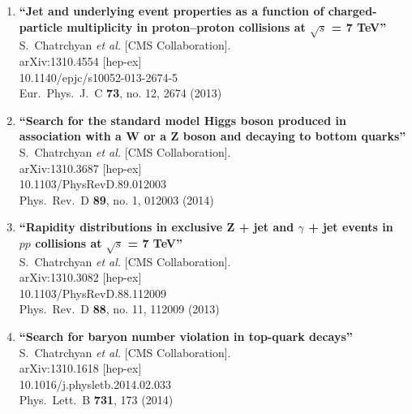 \documentclass{article}
\begin{document}
\begin{enumerate}
\item%
{\bf ``Jet and underlying event properties as a function of charged-particle multiplicity in proton–proton collisions at $\sqrt{s}$ = 7 TeV''}
  \\{}S.~Chatrchyan {\it et al.}  [CMS Collaboration].
  \\{}arXiv:1310.4554 [hep-ex]
    \\{}10.1140/epjc/s10052-013-2674-5
\\{}Eur.\ Phys.\ J.\ C {\bf 73}, no. 12, 2674 (2013) %


\item%
{\bf ``Search for the standard model Higgs boson produced in association with a W or a Z boson and decaying to bottom quarks''}
  \\{}S.~Chatrchyan {\it et al.}  [CMS Collaboration].
  \\{}arXiv:1310.3687 [hep-ex]
    \\{}10.1103/PhysRevD.89.012003
\\{}Phys.\ Rev.\ D {\bf 89}, no. 1, 012003 (2014) %


\item%
{\bf ``Rapidity distributions in exclusive Z + jet and $\gamma$ + jet events in $pp$ collisions at $\sqrt{s}$ = 7 TeV''}
  \\{}S.~Chatrchyan {\it et al.}  [CMS Collaboration].
  \\{}arXiv:1310.3082 [hep-ex]
    \\{}10.1103/PhysRevD.88.112009
\\{}Phys.\ Rev.\ D {\bf 88}, no. 11, 112009 (2013) %


\item%
{\bf ``Search for baryon number violation in top-quark decays''}
  \\{}S.~Chatrchyan {\it et al.}  [CMS Collaboration].
  \\{}arXiv:1310.1618 [hep-ex]
    \\{}10.1016/j.physletb.2014.02.033
\\{}Phys.\ Lett.\ B {\bf 731}, 173 (2014) %



\end{enumerate}
\end{document}
